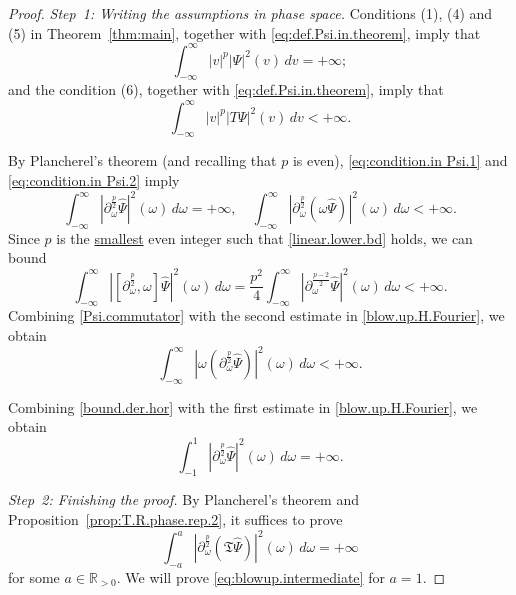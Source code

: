 \documentclass[10pt, reqno]{amsart}
\theoremstyle{definition}
\theoremstyle{remark}
\numberwithin{equation}{section}
\newcommand{\rd}{\partial}
\newcommand{\0}{\emptyset}
\newcommand{\om}{\omega}
\newcommand{\f}{\frac}
\newcommand{\pfstep}[1]{\vspace{.5em} {\it #1.}}
\begin{document}
\begin{proof}
\pfstep{Step~1: Writing the assumptions in phase space} Conditions (1), (4) and (5) in Theorem~\ref{thm:main}, together with \eqref{eq:def.Psi.in.theorem}, imply that 
\begin{equation}\label{eq:condition.in Psi.1}
\int_{-\infty}^{\infty} |v|^{p}|\Psi|^2(v)\, dv = +\infty;
\end{equation}
and the condition (6), together with \eqref{eq:def.Psi.in.theorem}, imply that
\begin{equation}\label{eq:condition.in Psi.2}
\int_{-\infty}^{\infty} |v|^{p}|T\Psi|^2(v)\, dv< +\infty.
\end{equation}

By Plancherel's theorem (and recalling that $p$ is even), \eqref{eq:condition.in Psi.1} and \eqref{eq:condition.in Psi.2} imply
\begin{equation}\label{blow.up.H.Fourier}
\int_{-\infty}^\infty \left|\rd_\om^{\f{p}{2}}\widehat{\Psi}\right|^2 (\om)\, d\om = +\infty,\quad\int_{-\infty}^\infty \left|\rd_\om^{\f{p}{2}}(\om\widehat{\Psi})\right|^2 (\om)\, d\om< +\infty.
\end{equation}
Since $p$ is the \underline{smallest} even integer such that \eqref{linear.lower.bd} holds, we can bound
\begin{equation}\label{Psi.commutator}
\int_{-\infty}^\infty \left|[\rd_\om^{\f{p}{2}},\om]\widehat{\Psi}\right|^2 (\om)\, d\om = \f{p^2}{4} \int_{-\infty}^\infty \left|\rd_\om^{\f{p-2}{2}}\widehat{\Psi}\right|^2 (\om)\, d\om < +\infty.
\end{equation}
Combining \eqref{Psi.commutator} with the second estimate in \eqref{blow.up.H.Fourier}, we obtain
\begin{equation}\label{bound.der.hor}
\int_{-\infty}^\infty \left|\om(\rd_\om^{\f{p}{2}}\widehat{\Psi})\right|^2 (\om)\, d\om< +\infty.
\end{equation}

Combining \eqref{bound.der.hor} with the first estimate in \eqref{blow.up.H.Fourier}, we obtain
\begin{equation}\label{most.useful.est}
\int_{-1}^1 \left|\rd_\om^{\f{p}{2}}\widehat{\Psi}\right|^2 (\om)\, d\om=+\infty.
\end{equation}

\pfstep{Step~2: Finishing the proof} By Plancherel's theorem and Proposition~\ref{prop:T.R.phase.rep.2}, it suffices to prove
\begin{equation}\label{eq:blowup.intermediate}
\int_{-a}^a \left|\rd_\om^{\f{p}{2}}(\mathfrak T\widehat{\Psi})\right|^2 (\om)\, d\om= +\infty
\end{equation}
for some $a\in \mathbb R_{>0}$. We will prove \eqref{eq:blowup.intermediate} for $a=1$.


\end{proof}
\end{document}
